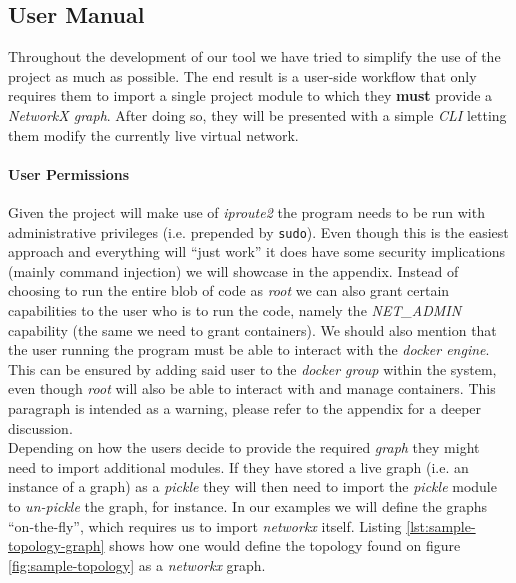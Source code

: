         \subsection{User Manual} \label{sec:user-manual}
            Throughout the development of our tool we have tried to simplify the use of the project as much as possible. The end result is a user-side workflow that only requires them to import a single project module to which they \textbf{must} provide a \textit{NetworkX graph}. After doing so, they will be presented with a simple \textit{CLI} letting them modify the currently live virtual network.\\

            \paragraph{User Permissions}
                Given the project will make use of \textit{iproute2} the program needs to be run with administrative privileges (i.e. prepended by \texttt{sudo}). Even though this is the easiest approach and everything will ``just work'' it does have some security implications (mainly command injection) we will showcase in the appendix. Instead of choosing to run the entire blob of code as \textit{root} we can also grant certain capabilities to the user who is to run the code, namely the \textit{NET\_ADMIN} capability (the same we need to grant containers). We should also mention that the user running the program must be able to interact with the \textit{docker engine}. This can be ensured by adding said user to the \textit{docker group} within the system, even though \textit{root} will also be able to interact with and manage containers. This paragraph is intended as a warning, please refer to the appendix for a deeper discussion.\\

            Depending on how the users decide to provide the required \textit{graph} they might need to import additional modules. If they have stored a live graph (i.e. an instance of a graph) as a \textit{pickle} \cite{bib:python-pickle} they will then need to import the \textit{pickle} module to \textit{un-pickle} the graph, for instance. In our examples we will define the graphs ``on-the-fly'', which requires us to import \textit{networkx} itself. Listing \ref{lst:sample-topology-graph} shows how one would define the topology found on figure \ref{fig:sample-topology} as a \textit{networkx} graph.\\

